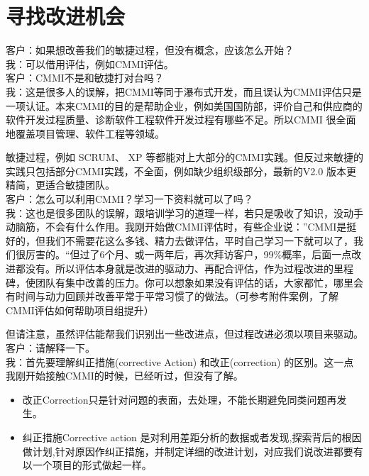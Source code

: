\chapter{寻找改进机会} %

客户：如果想改善我们的敏捷过程，但没有概念，应该怎么开始？\\
我：可以借用评估，例如CMMI评估。\\
客户：CMMI不是和敏捷打对台吗？\\
我：这是很多人的误解，把CMMI等同于瀑布式开发，而且误认为CMMI评估只是一项认证。本来CMMI的目的是帮助企业，例如美国国防部，评价自己和供应商的软件开发过程质量、诊断软件工程软件开发过程有哪些不足。所以CMMI
很全面地覆盖项目管理、软件工程等领域。

敏捷过程，例如 SCRUM、 XP
等都能对上大部分的CMMI实践。但反过来敏捷的实践只包括部分CMMI实践，不全面，例如缺少组织级部分，最新的V2.0
版本更精简，更适合敏捷团队。\\
客户：怎么可以利用CMMI？学习一下资料就可以了吗？\\
我：这也是很多团队的误解，跟培训学习的道理一样，若只是吸收了知识，没动手动脑筋，不会有什么作用。我刚开始做CMMI评估时，有些企业说：''CMMI是挺好的，但我们不需要花这么多钱、精力去做评估，平时自己学习一下就可以了，我们很厉害的。``但过了6个月、或一两年后，再次拜访客户，99\%概率，后面一点改进都没有。所以评估本身就是改进的驱动力、再配合评估，作为过程改进的里程碑，使团队有集中改善的压力。你可以想象如果没有评估的话，大家都忙，哪里会有时间与动力回顾并改善平常于平常习惯了的做法。（可参考附件案例，了解CMMI评估如何帮助项目组提升）

但请注意，虽然评估能帮我们识别出一些改进点，但过程改进必须以项目来驱动。\\
客户：请解释一下。\\
我：首先要理解纠正措施(corrective Action) 和改正(correction)
的区别。这一点我刚开始接触CMMI的时候，已经听过，但没有了解。

\begin{itemize}
\tightlist
\item
  改正Correction只是针对问题的表面，去处理，不能长期避免同类问题再发生。
\item
  纠正措施Corrective action
  是对利用差距分析的数据或者发现,探索背后的根因做计划,针对原因作纠正措施，并制定详细的改进计划，对应我们说改进都要有以一个项目的形式做起一样。
\end{itemize}

